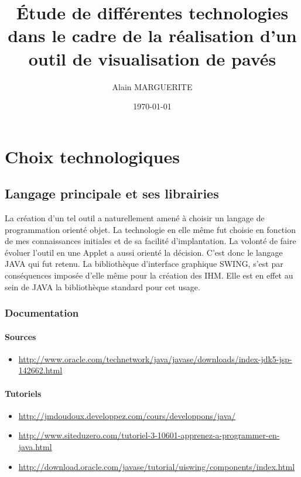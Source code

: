 \documentclass{article}
\author{Alain MARGUERITE}
\title{\textbf{Étude de différentes technologies dans le cadre de la réalisation d'un outil de visualisation de pavés}}
\date{\today}
\begin{document}
\maketitle{}     

\section{Choix technologiques}
\subsection{Langage principale et ses librairies}
La création d'un tel outil a naturellement amené à choisir un langage de programmation orienté objet.
La technologie en elle même fut choisie en fonction de mes connaissances initiales et de sa facilité d'implantation.
La volonté de faire évoluer l'outil en une Applet a aussi orienté la décision. C'est donc le langage JAVA qui fut retenu.
La bibliothèque d'interface graphique SWING, s'est par conséquences imposée d'elle même pour la création des IHM. Elle est en effet au sein de JAVA la bibliothèque standard pour cet usage.
\subsubsection{Documentation}
\paragraph{Sources}
\begin{itemize}
\item 
\url{http://www.oracle.com/technetwork/java/javase/downloads/index-jdk5-jsp-142662.html}                                                             
\end{itemize}

\paragraph{Tutoriels}
\begin{itemize}
\item 
\url{http://jmdoudoux.developpez.com/cours/developpons/java/}
\item 
\url{http://www.siteduzero.com/tutoriel-3-10601-apprenez-a-programmer-en-java.html}
\item 
\url{http://download.oracle.com/javase/tutorial/uiswing/components/index.html}
\end{itemize}
\end{document}

